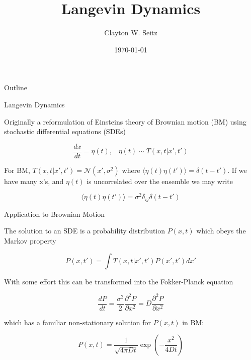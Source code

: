 \documentclass{beamer}					%
\title{Langevin Dynamics}	%
\author{Clayton W. Seitz}								%
\date{\today}									%
\begin{document}
\begin{frame}
  \titlepage
\end{frame}

\begin{frame}{Outline}
  \tableofcontents
\end{frame}

\begin{frame}{Langevin Dynamics}

Originally a reformulation of Einsteins theory of Brownian motion (BM) using stochastic differential equations (SDEs)

\begin{equation*}
\frac{dx}{dt} = \eta(t), \;\;\; \eta(t) \sim T(x,t|x',t')
\end{equation*}

For BM, $T(x,t|x',t') = \mathcal{N}(x',\sigma^{2})$ where $\langle \eta(t)\eta(t')\rangle = \delta(t-t')$. If we have many x's, and $\eta(t)$ is uncorrelated over the ensemble we may write 

\begin{equation*}
\langle \eta(t)\eta(t')\rangle = \sigma^{2}\delta_{ij}\delta(t-t')
\end{equation*}

\end{frame}

\begin{frame}{Application to Brownian Motion}

The solution to an SDE is a probability distribution $P(x,t)$ which obeys the Markov property

\begin{equation*}
P(x,t') = \int T(x,t|x',t')P(x',t')dx'
\end{equation*}


With some effort this can be transformed into the Fokker-Planck equation

\begin{equation*}
\frac{dP}{dt} = \frac{\sigma^{2}}{2}\frac{\partial^{2}P}{\partial x^{2}} = D\frac{\partial^{2}P}{\partial x^{2}}
\end{equation*}

which has a familiar non-stationary solution for $P(x,t)$ in BM:

\begin{equation*}
P(x,t) = \frac{1}{\sqrt{4\pi Dt}}\exp\left(-\frac{x^{2}}{4Dt}\right)
\end{equation*}

\end{frame}
\end{document}
